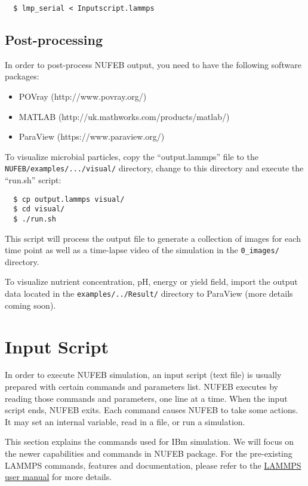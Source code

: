 \documentclass[11pt,a4paper,openright]{article}
\begin{document}
\begin{verbatim}
  $ lmp_serial < Inputscript.lammps
\end{verbatim}

\subsection{Post-processing}

In order to post-process NUFEB output, you need to have the following software packages:

\begin{itemize}
\item POVray (http://www.povray.org/) 
\item MATLAB (http://uk.mathworks.com/products/matlab/)
\item ParaView (https://www.paraview.org/) 
\end{itemize}

\noindent
To visualize microbial particles, copy the ``output.lammps'' file to the \\
{\tt NUFEB/examples/.../visual/} directory, change to this directory and execute the ``run.sh'' script:

\begin{verbatim}
  $ cp output.lammps visual/
  $ cd visual/
  $ ./run.sh
\end{verbatim}

\noindent
This script will process the output file to generate a collection of images for each time point as well as a time-lapse video of the simulation in the {\tt 0\_images/} directory.

To visualize nutrient concentration, pH, energy or yield field, import the output data located in the {\tt examples/../Result/} directory to ParaView (more details coming soon).

\section{Input Script}

In order to execute NUFEB simulation, an input script (text file) is usually prepared with certain commands and parameters list. NUFEB executes by reading those commands and parameters, one line at a time. When the input script ends, NUFEB exits. Each command causes NUFEB to take some actions. It may set an internal variable, read in a file, or run a simulation.

This section explains the commands used for IBm simulation. We will focus on the newer capabilities and commands in NUFEB package. For the pre-existing LAMMPS commands, features and documentation, please
refer to the \href{http://lammps.sandia.gov/doc/Manual.pdf}{LAMMPS user manual} for more details.
\end{document}
